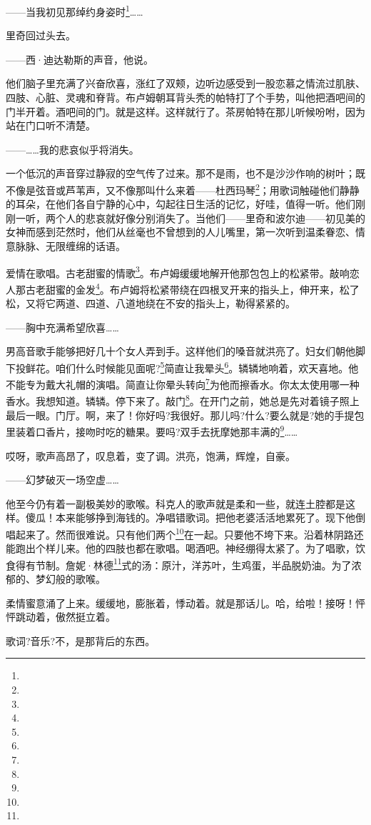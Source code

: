 \par ——当我初见那绰约身姿时\footnote{}……
\par 里奇回过头去。
\par ——西·迪达勒斯的声音，他说。
\par 他们脑子里充满了兴奋欣喜，涨红了双颊，边听边感受到一股恋慕之情流过肌肤、四肢、心脏、灵魂和脊背。布卢姆朝耳背头秃的帕特打了个手势，叫他把酒吧间的门半开着。酒吧间的门。就是这样。这样就行了。茶房帕特在那儿听候吩咐，因为站在门口听不清楚。
\par ——……我的悲哀似乎将消失。
\par 一个低沉的声音穿过静寂的空气传了过来。那不是雨，也不是沙沙作响的树叶；既不像是弦音或芦苇声，又不像那叫什么来着——杜西玛琴\footnote{}；用歌词触碰他们静静的耳朵，在他们各自宁静的心中，勾起往日生活的记忆，好哇，值得一听。他们刚刚一听，两个人的悲哀就好像分别消失了。当他们——里奇和波尔迪——初见美的女神而感到茫然时，他们从丝毫也不曾想到的人儿嘴里，第一次听到温柔眷恋、情意脉脉、无限缠绵的话语。
\par 爱情在歌唱。古老甜蜜的情歌\footnote{}。布卢姆缓缓地解开他那包包上的松紧带。敲响恋人那古老甜蜜的金发\footnote{}。布卢姆将松紧带绕在四根叉开来的指头上，伸开来，松了松，又将它两道、四道、八道地绕在不安的指头上，勒得紧紧的。
\par ——胸中充满希望欣喜……
\par 男高音歌手能够把好几十个女人弄到手。这样他们的嗓音就洪亮了。妇女们朝他脚下投鲜花。咱们什么时候能见面呢?\footnote{}简直让我晕头\footnote{}。辚辚地响着，欢天喜地。他不能专为戴大礼帽的演唱。简直让你晕头转向\footnote{}为他而擦香水。你太太使用哪一种香水。我想知道。辚辚。停下来了。敲门\footnote{}。在开门之前，她总是先对着镜子照上最后一眼。门厅。啊，来了！你好吗?我很好。那儿吗?什么?要么就是?她的手提包里装着口香片，接吻时吃的糖果。要吗?双手去抚摩她那丰满的\footnote{}……
\par 哎呀，歌声高昂了，叹息着，变了调。洪亮，饱满，辉煌，自豪。
\par ——幻梦破灭一场空虚……
\par 他至今仍有着一副极美妙的歌喉。科克人的歌声就是柔和一些，就连土腔都是这样。傻瓜！本来能够挣到海钱的。净唱错歌词。把他老婆活活地累死了。现下他倒唱起来了。然而很难说。只有他们两个\footnote{}在一起。只要他不垮下来。沿着林阴路还能跑出个样儿来。他的四肢也都在歌唱。喝酒吧。神经绷得太紧了。为了唱歌，饮食得有节制。詹妮·林德\footnote{}式的汤：原汁，洋苏叶，生鸡蛋，半品脱奶油。为了浓郁的、梦幻般的歌喉。
\par 柔情蜜意涌了上来。缓缓地，膨胀着，悸动着。就是那话儿。哈，给啦！接呀！怦怦跳动着，傲然挺立着。
\par 歌词?音乐?不，是那背后的东西。
